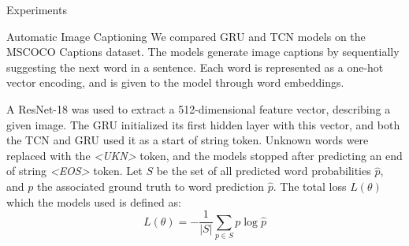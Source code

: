 \documentclass[paperwidth=24in,paperheight=48in, fontscale=0.4166666666666]{baposter}
\begin{document}
\begin{poster}
\begin{posterbox}[name=experiments,column=1, row=0]{Experiments}
\vspace{-15pt}
\begin{minipage}{0.7\linewidth}
   \centering
   \label{tabseqmnist}
\end{minipage}
\begin{minipage}{0.25\linewidth}
\vspace{10pt}
\end{minipage}
\vspace{-7pt}
\end{posterbox}












\begin{posterbox}[name=imagecaptioning,column=1,below=experiments]{Automatic Image Captioning}
We compared GRU and TCN models on the MSCOCO Captions \cite{mscoco} dataset. The models generate image captions by sequentially suggesting the next word in a sentence. Each word is represented as a one-hot vector encoding, and is given to the model through word embeddings.
\vspace{10pt}

A ResNet-18 \cite{resnet} was used to extract a 512-dimensional feature vector, describing a given image. The GRU initialized its first hidden layer with this vector, and both the TCN and GRU used it as a start of string token. Unknown words were replaced with the \textit{<UKN>} token, and the models stopped after predicting an end of string \textit{<EOS>} token. Let $S$ be the set of all predicted word probabilities $\hat{p}$, and $p$ the associated ground truth to word prediction $\hat{p}$. The total loss $L(\theta)$ which the models used is defined as:
\begin{equation}
L(\theta) = -\frac{1}{|S|} \sum_{p \in S} p \log{\hat{p}}
\end{equation}


\end{posterbox}
\end{poster}
\end{document}
